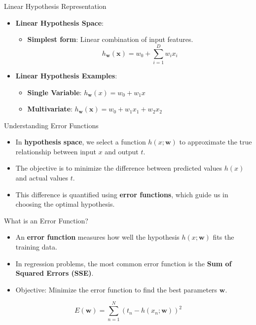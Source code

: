 \documentclass[serif, aspectratio=169]{beamer}
\begin{document}
\begin{frame}{Linear Hypothesis Representation}
    \begin{itemize}
        \item \textbf{Linear Hypothesis Space}:
        \begin{itemize}
            \item \textbf{Simplest form}: Linear combination of input features.
            \[
            h_{\mathbf{w}}(\mathbf{x}) = w_0 + \sum_{i=1}^{D} w_i x_i
            \]
        \end{itemize}
        \item \textbf{Linear Hypothesis Examples}:
        \begin{itemize}
            \item \textbf{Single Variable}: \( h_{\mathbf{w}}(x) = w_0 + w_1 x \)
            \item \textbf{Multivariate}: \( h_{\mathbf{w}}(\mathbf{x}) = w_0 + w_1 x_1 + w_2 x_2 \)
        \end{itemize}
    \end{itemize}
\end{frame}

\begin{frame}{Understanding Error Functions}
    \begin{itemize}
        \item In \textbf{hypothesis space}, we select a function \( h(x; \mathbf{w}) \) to approximate the true relationship between input \( x \) and output \( t \).
        \item The objective is to minimize the difference between predicted values \( h(x) \) and actual values \( t \).
        \item This difference is quantified using \textbf{error functions}, which guide us in choosing the optimal hypothesis.
    \end{itemize}
\end{frame}


\begin{frame}{What is an Error Function?}
    \begin{itemize}
        \item An \textbf{error function} measures how well the hypothesis \( h(x; \mathbf{w}) \) fits the training data.
        \item In regression problems, the most common error function is the \textbf{Sum of Squared Errors (SSE)}.
        \item Objective: Minimize the error function to find the best parameters \( \mathbf{w} \).
    \end{itemize}
    \[
    E(\mathbf{w}) = \sum_{n=1}^{N} \left( t_n - h(x_n; \mathbf{w}) \right)^2
    \]
\end{frame}
\end{document}
